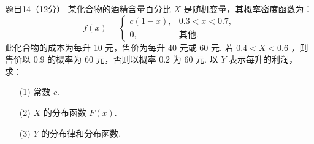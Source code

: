 \documentclass{article}
\begin{document}
\begin{question}{题目14（12分）}
    某化合物的酒精含量百分比 $X$ 是随机变量，其概率密度函数为：
    $$
        f(x) = \begin{cases}
            c(1-x), & 0.3<x<0.7, \\
            0,      & \text{其他.}
        \end{cases}
    $$
    此化合物的成本为每升 10 元，售价为每升 40 元或 60 元. 若 $0.4<X<0.6$ ，则售价以 0.9 的概率为 60 元，否则以概率 0.2 为 60 元. 以 $Y$ 表示每升的利润，求：
    \begin{itemize}
        \item [(1)] 常数 $c$.
        \item [(2)] $X$ 的分布函数 $F(x)$.
        \item [(3)] $Y$ 的分布律和分布函数.
    \end{itemize}
\end{question}
\end{document}
